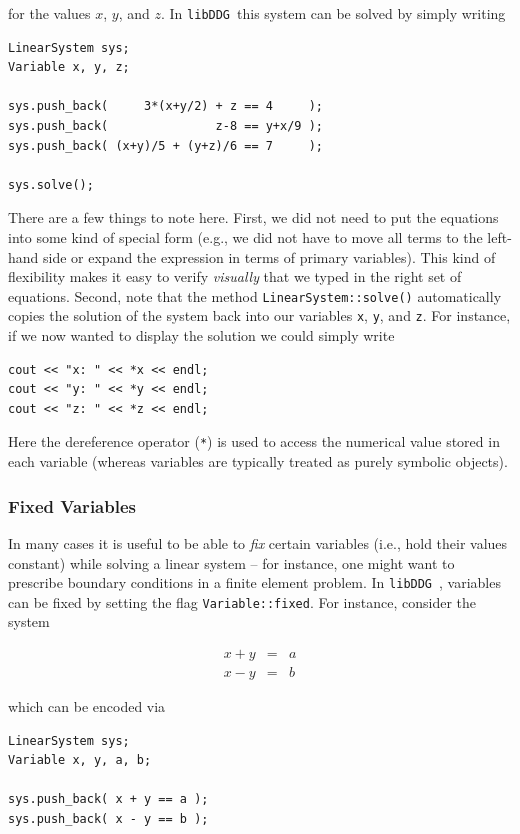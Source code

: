 \documentclass{article}
\newcommand{\libddg}{\texttt{libDDG}\ }
\begin{document}
for the values \(x\), \(y\), and \(z\).  In \libddg this system can be solved by simply writing

\begin{verbatim}
LinearSystem sys;
Variable x, y, z;

sys.push_back(     3*(x+y/2) + z == 4     );
sys.push_back(               z-8 == y+x/9 );
sys.push_back( (x+y)/5 + (y+z)/6 == 7     );

sys.solve();
\end{verbatim}

There are a few things to note here.  First, we did not need to put the equations into some kind of special form (e.g., we did not have to move all terms to the left-hand side or expand the expression in terms of primary variables).  This kind of flexibility makes it easy to verify \emph{visually} that we typed in the right set of equations.  Second, note that the method \texttt{LinearSystem::solve()} automatically copies the solution of the system back into our variables \texttt{x}, \texttt{y}, and \texttt{z}.  For instance, if we now wanted to display the solution we could simply write

\begin{verbatim}
cout << "x: " << *x << endl;
cout << "y: " << *y << endl;
cout << "z: " << *z << endl;
\end{verbatim}

Here the dereference operator (\texttt{*}) is used to access the numerical value stored in each variable (whereas variables are typically treated as purely symbolic objects).

\subsubsection{Fixed Variables}

In many cases it is useful to be able to \emph{fix} certain variables (i.e., hold their values constant) while solving a linear system -- for instance, one might want to prescribe boundary conditions in a finite element problem.  In \libddg, variables can be fixed by setting the flag \texttt{Variable::fixed}.  For instance, consider the system

\[
   \begin{array}{rcl}
   x + y &=& a \\
   x - y &=& b
   \end{array}
\]

which can be encoded via

\begin{verbatim}
LinearSystem sys;
Variable x, y, a, b;

sys.push_back( x + y == a );
sys.push_back( x - y == b );
\end{verbatim}
\end{document}
